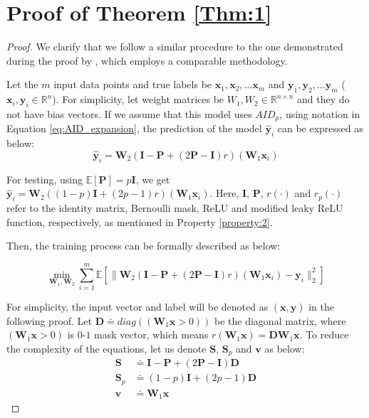 

\section{Proof of Theorem \ref{Thm:1}}
\label{app:proof_1}
\begin{proof}
    We clarify that we follow a similar procedure to the one demonstrated during the proof by \citet{liang2021drop}, which employs a comparable methodology.
    
    Let the  $m$ input data points and true labels be $\mathbf{x}_1, \mathbf{x}_2, \dots \mathbf{x}_m$ and $\mathbf{y}_1, \mathbf{y}_2, \dots \mathbf{y}_m$ ($\mathbf{x}_i, \mathbf{y}_i \in \mathbb R^n$). For simplicity, let weight matrices be  $W_1, W_2 \in \mathbb R^{n\times n}$ and they do not have bias vectors. If we assume that this model uses $AID_p$, using notation in Equation \eqref{eq:AID_expansion}, the prediction of the model $\hat{\mathbf{y}}_i$ can be expressed as below:
    \[\hat{\mathbf{y}}_i = \mathbf{W}_2\left(\mathbf{I}-\mathbf{P}+(2\mathbf{P}-\mathbf{I})r\right)(\mathbf{W}_1\mathbf{x}_i)\]

    For testing, using $\mathbb E[\mathbf{P}] = p\mathbf{I}$, we get $\hat{\mathbf{y}}_i = \mathbf{W}_2((1-p)\mathbf{I} + (2p-1)r)(\mathbf{W}_1\mathbf{x}_i)$. Here, $\mathbf{I}$, $\mathbf{P}$, $r(\cdot)$ and $r_p(\cdot)$ refer to the identity matrix, Bernoulli mask, ReLU and modified leaky ReLU function, respectively, as mentioned in Property \ref{property:2}. 

    Then, the training process can be formally described as below:

    \[\min_{\mathbf{W}_1,\mathbf{W}_2}\sum_{i=1}^m \mathbb E\left[\|\mathbf{W}_2\left(\mathbf{I}-\mathbf{P}+(2\mathbf{P}-\mathbf{I})r\right)(\mathbf{W}_1\mathbf{x}_i)- \mathbf{y}_i\|_2^2\right]\]

    For simplicity, the input vector and label will be denoted as $(\mathbf{x}, \mathbf{y})$ in the following proof. Let $\mathbf{D}\doteq diag((\mathbf{W}_1\mathbf{x}>0))$ be the diagonal matrix, where $(\mathbf{W}_1\mathbf{x}>0)$ is $0$-$1$ mask vector, which means $ r(\mathbf{W}_1\mathbf{x}) = \mathbf{D}\mathbf{W}_1\mathbf{x}$. To reduce the complexity of the equations, let us denote $\mathbf{S}$, $\mathbf{S}_p$ and $\mathbf{v}$ as below:
    \begin{align*}
    \mathbf{S}&\doteq \mathbf{I} - \mathbf{P} + (2\mathbf{P}-\mathbf{I})\mathbf{D} \\
    \mathbf{S}_p &\doteq (1- p)\mathbf{I} + (2p-1)\mathbf{D} \\ \mathbf{v} &\doteq \mathbf{W}_1\mathbf{x}
    \end{align*}


\end{proof}
